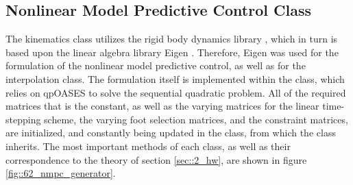 \subsection{Nonlinear Model Predictive Control Class}
The kinematics class utilizes the rigid body dynamics library \cite{felis2017rbdl}, which in turn is based upon the linear algebra library Eigen \cite{eigenweb}. Therefore, Eigen was used for the formulation of the nonlinear model predictive control, as well as for the interpolation class. The formulation itself is implemented within the  class, which relies on qpOASES \cite{ferreau2014qpoases} to solve the sequential quadratic problem. All of the required matrices that is the constant, as well as the varying matrices for the linear time-stepping scheme, the varying foot selection matrices, and the constraint matrices, are initialized, and constantly being updated in the  class, from which the  class inherits. The most important methods of each class, as well as their correspondence to the theory of section \ref{sec::2_hw}, are shown in figure \ref{fig::62_nmpc_generator}.
